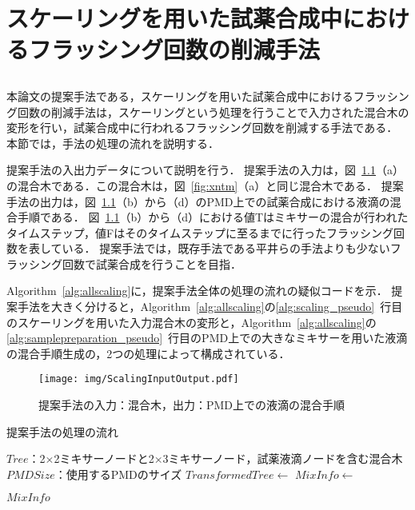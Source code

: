 \chapter{スケーリングを用いた試薬合成中におけるフラッシング回数の削減手法}
\section{}
本論文の提案手法である，スケーリングを用いた試薬合成中におけるフラッシング回数の削減手法は，スケーリングという処理を行うことで入力された混合木の変形を行い，試薬合成中に行われるフラッシング回数を削減する手法である．
本節では，手法の処理の流れを説明する．

提案手法の入出力データについて説明を行う．
提案手法の入力は，図~\ref{fig:ScalingInputOutput}（a）の混合木である．この混合木は，図~\ref{fig:xntm}（a）と同じ混合木である．
提案手法の出力は，図~\ref{fig:ScalingInputOutput}（b）から（d）のPMD上での試薬合成における液滴の混合手順である．
図~\ref{fig:ScalingInputOutput}（b）から（d）における値Tはミキサーの混合が行われたタイムステップ，値Fはそのタイムステップに至るまでに行ったフラッシング回数を表している．
提案手法では，既存手法である平井らの手法よりも少ないフラッシング回数で試薬合成を行うことを目指．

Algorithm~\ref{alg:allscaling}に，提案手法全体の処理の流れの疑似コードを示．
提案手法を大きく分けると，Algorithm~\ref{alg:allscaling}の\ref{alg:scaling_pseudo}~行目のスケーリングを用いた入力混合木の変形と，Algorithm~\ref{alg:allscaling}の\ref{alg:samplepreparation_pseudo}~行目のPMD上での大きなミキサーを用いた液滴の混合手順生成の，2つの処理によって構成されている．

\begin{figure}[tbp]
 \centering\texttt{[image: img/ScalingInputOutput.pdf]}
 \caption{提案手法の入力：混合木，出力：PMD上での液滴の混合手順}\label{fig:ScalingInputOutput}
\end{figure}

\begin{algorithm}[tbp]
 \caption{提案手法の処理の流れ}\label{alg:allscaling}
 \begin{algorithmic}[1]
     \Require $\mathit{Tree}$：2$\times$2ミキサーノードと2$\times$3ミキサーノード，試薬液滴ノードを含む混合木
     \Require $\mathit{PMDSize}$：使用するPMDのサイズ
     \State $\mathit{TransformedTree} \gets$  \label{alg:scaling_pseudo}
     \State $\mathit{MixInfo \gets}$  \label{alg:samplepreparation_pseudo}

      \Return $\mathit{MixInfo}$
 \end{algorithmic}
\end{algorithm}

